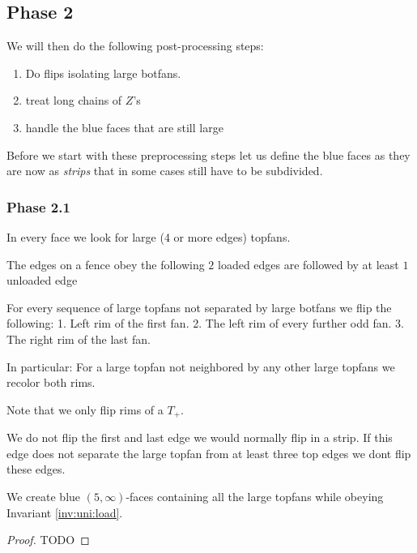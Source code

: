 \subsection{Phase 2}
  We will then do the following post-processing steps:

  \begin{enumerate}
    \item Do flips isolating large botfans.
    \item treat long chains of $Z$'s
    \item handle the blue faces that are still large
  \end{enumerate}

  Before we start with these preprocessing steps let us define the blue faces as they are now as \emph{strips} that in some cases still have to be subdivided.

  \subsubsection{Phase 2.1}
    In every face we look for large (4 or more edges) topfans.

    \begin{invariants}
      \label{inv:uni:load}
      \item The edges on a fence obey the following $2$ loaded edges are followed by at least $1$ unloaded edge
    \end{invariants}

    For every sequence of large topfans not separated by large botfans we flip the following:
    1. Left rim of the first fan.
    2. The left rim of every further odd fan.
    3. The right rim of the last fan.

    In particular: For a large topfan not neighbored by any other large topfans we recolor both rims.

    Note that we only flip rims of a $T_+$.

    We do not flip the first and last edge we would normally flip in a strip. If this edge does not separate the large topfan from at least three top edges we dont flip these edges.

    \begin{lemma}
      \label{lm:uni:removingLargeB-fans}
      We create blue $(5, \infty)$-faces containing all the large topfans while obeying Invariant \ref{inv:uni:load}.
    \end{lemma}
    \begin{proof}
      TODO 
    \end{proof}

